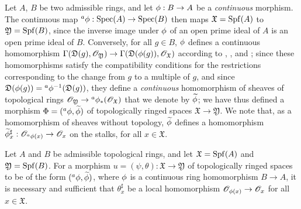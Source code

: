 \begin{env}[10.2.1]
\label{I.10.2.1}
Let $A$, $B$ be two admissible rings, and let $\vphi:B\to A$ be a \emph{continuous} morphism.
The continuous map ${}^a\vphi:\Spec(A)\to\Spec(B)$  then maps $\mathfrak{X}=\operatorname{Spf}(A)$ to $\mathfrak{Y}=\operatorname{Spf}(B)$, since the inverse image under $\phi$ of an open prime ideal of $A$ is an open prime ideal of $B$.
Conversely, for all $g\in B$, $\phi$ defines a continuous homomorphism $\Gamma(\mathfrak{D}(g),\sh{O}_\mathfrak{Y})\to\Gamma(\mathfrak{D}(\vphi(g)),\sh{O}_\mathfrak{X})$ according to , , and ;
since these homomorphisms satisfy the compatibility conditions for the restrictions corresponding to the change from $g$ to a multiple of $g$, and since $\mathfrak{D}(\phi(g))={}^a\phi^{-1}(\mathfrak{D}(g))$, they define a \emph{continuous} homomorphism of sheaves of topological rings $\sh{O}_\mathfrak{Y}\to{}^a\vphi_*(\sh{O}_\mathfrak{X})$  that we denote by $\widetilde{\phi}$;
we have thus defined a morphism $\Phi=({}^a\phi,\widetilde{\phi})$ of topologically ringed spaces $\mathfrak{X}\to\mathfrak{Y}$.
We note that, as a homomorphism of sheaves without topology, $\widetilde{\phi}$ defines a homomorphism $\widetilde{\vphi}_x^\sharp:\sh{O}_{{}^a\vphi(x)}\to\sh{O}_x$ on the stalks, for all $x\in\mathfrak{X}$.
\end{env}

\begin{proposition}[10.2.2]
\label{I.10.2.2}
Let $A$ and $B$ be admissible topological rings, and let $\mathfrak{X}=\operatorname{Spf}(A)$ and $\mathfrak{Y}=\operatorname{Spf}(B)$.
For a morphism $u=(\psi,\theta):\mathfrak{X}\to\mathfrak{Y}$ of topologically ringed spaces to be of the form $({}^a\phi,\widetilde{\phi})$, where $\phi$ is a continuous ring homomorphism $B\to A$, it is necessary and sufficient that $\theta_x^\sharp$ be a local homomorphism $\sh{O}_{\vphi(x)}\to\sh{O}_x$ for all $x\in\mathfrak{X}$.
\end{proposition}

